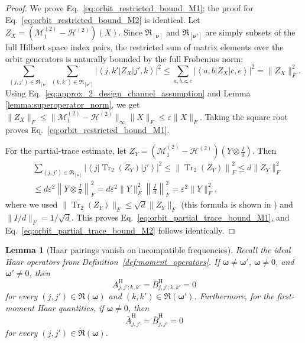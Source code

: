 \documentclass[%
 reprint,
 amsmath,amssymb,
 aps,
 pra,
]{revtex4-2}
\newtheorem{lemma}[theorem]{Lemma}
\theoremstyle{definition}
\begin{document}
\begin{proof}
We prove Eq.~\eqref{eq:orbit_restricted_bound_M1}; the proof for Eq.~\eqref{eq:orbit_restricted_bound_M2} is identical. Let $Z_X = (\mathcal M^{(2)}_1-\mathcal H^{(2)})(X)$. Since $\mathfrak R_{[\bm{\nu}]}$ and $\mathfrak R_{[\bm{\nu}']}$ are simply subsets of the full Hilbert space index pairs, the restricted sum of matrix elements over the orbit generators is naturally bounded by the full Frobenius norm:
\begin{equation}
\sum_{(j,j')\in\mathfrak R_{[\bm{\nu}]}}
\sum_{(k,k')\in\mathfrak R_{[\bm{\nu}']}}
\left|
\left\langle j,k'\right|
Z_X
\left|j',k\right\rangle
\right|^2
\leq
\sum_{a,b,c,e}
\left|
\left\langle a,b\right|
Z_X
\left|c,e\right\rangle
\right|^2
=
\|Z_X\|_F^2.
\end{equation}
Using Eq.~\eqref{eq:approx_2_design_channel_assumption} and Lemma \ref{lemma:superoperator_norm}, we get $\|Z_X\|_F \leq \|\mathcal M^{(2)}_1-\mathcal H^{(2)}\|_{\infty} \|X\|_F \leq \varepsilon\|X\|_F$. Taking the square root proves Eq.~\eqref{eq:orbit_restricted_bound_M1}.

For the partial-trace estimate, let $Z_Y = (\mathcal M^{(2)}_1-\mathcal H^{(2)})(Y\otimes\frac{I}{d})$. Then
\begin{align}
&\sum_{(j,j')\in\mathfrak R_{[\bm{\nu}]}}
\left|
\left\langle j\right|
\operatorname{Tr}_2(Z_Y)
\left|j'\right\rangle
\right|^2
\leq
\left\| \operatorname{Tr}_2(Z_Y) \right\|_F^2
\leq
d\|Z_Y\|_F^2 \nonumber \\
&\leq
d\varepsilon^2
\left\| Y\otimes\frac{I}{d} \right\|_F^2
=
d\varepsilon^2 \|Y\|_F^2 \left\|\frac{I}{d}\right\|_F^2
=
\varepsilon^2\|Y\|_F^2,
\end{align}
where we used $\|\operatorname{Tr}_2(Z_Y)\|_F\leq\sqrt d\|Z_Y\|_F$ (this formula is shown in \cite[Proposition 1]{Rastegin2012}) and $\|I/d\|_F=1/\sqrt d$. This proves Eq.~\eqref{eq:orbit_partial_trace_bound_M1}, and Eq.~\eqref{eq:orbit_partial_trace_bound_M2} follows identically.
\end{proof}


\begin{lemma}[Haar pairings vanish on incompatible frequencies]
\label{lemma:haar_pairing_zero_frequency}
Recall the ideal Haar operators from Definition~\ref{def:moment_operators}. If $\bm{\omega}\neq\bm{\omega}'$, $\bm{\omega}\neq0$, and $\bm{\omega}'\neq0$, then
\begin{equation}
A^{\mathrm H}_{j,j';k,k'} = B^{\mathrm H}_{j,j';k,k'} = 0
\end{equation}
for every $(j,j')\in\mathfrak R(\bm{\omega})$ and $(k,k')\in\mathfrak R(\bm{\omega}')$. Furthermore, for the first-moment Haar quantities, if $\bm{\omega}\neq0$, then
\begin{equation}
\bar A^{\mathrm H}_{j,j'} = \bar B^{\mathrm H}_{j,j'} = 0
\end{equation}
for every $(j,j')\in\mathfrak R(\bm{\omega})$.
\end{lemma}
\end{document}
